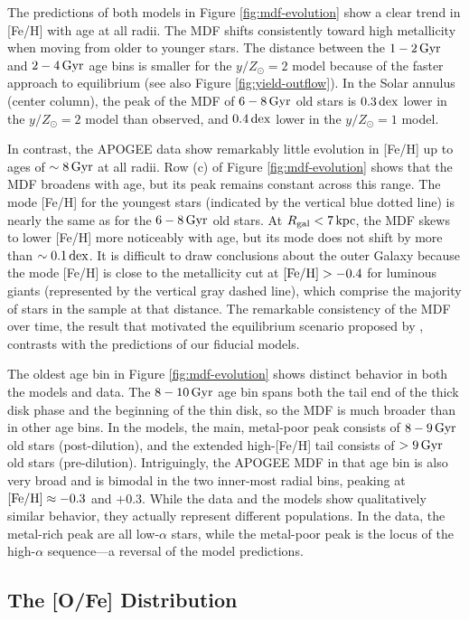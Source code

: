 \documentclass[twocolumn,twocolappendix,linenumbers]{aastex631}
\newcommand{\mathFeH}{{\rm [Fe/H]}}
\newcommand{\yZ}[1]{$y/Z_\odot=#1$}
\newcommand{\kpc}{\,{\rm kpc}}
\newcommand{\Gyr}{\,{\rm Gyr}}
\newcommand{\dex}{\,{\rm dex}}
\begin{document}
The predictions of both models in Figure \ref{fig:mdf-evolution} show a clear trend in [Fe/H] with age at all radii. The MDF shifts consistently toward high metallicity when moving from older to younger stars. The distance between the $1-2\Gyr$ and $2-4\Gyr$ age bins is smaller for the \yZ{2} model because of the faster approach to equilibrium (see also Figure \ref{fig:yield-outflow}). In the Solar annulus (center column), the peak of the MDF of $6-8\Gyr$ old stars is $0.3\dex$ lower in the \yZ{2} model than observed, and $0.4\dex$ lower in the \yZ{1} model.

In contrast, the APOGEE data show remarkably little evolution in [Fe/H] up to ages of $\sim8\Gyr$ at all radii. Row (c) of Figure \ref{fig:mdf-evolution} shows that the MDF broadens with age, but its peak remains constant across this range. The mode [Fe/H] for the youngest stars (indicated by the vertical blue dotted line) is nearly the same as for the $6-8\Gyr$ old stars. At $R_{\rm gal}<7\kpc$, the MDF skews to lower [Fe/H] more noticeably with age, but its mode does not shift by more than $\sim0.1\dex$. It is difficult to draw conclusions about the outer Galaxy because the mode [Fe/H] is close to the metallicity cut at $\mathFeH>-0.4$ for luminous giants (represented by the vertical gray dashed line), which comprise the majority of stars in the sample at that distance. The remarkable consistency of the MDF over time, the result that motivated the equilibrium scenario proposed by \citet{johnson_milky_2024}, contrasts with the predictions of our fiducial models.

The oldest age bin in Figure \ref{fig:mdf-evolution} shows distinct behavior in both the models and data. The $8-10\Gyr$ age bin spans both the tail end of the thick disk phase and the beginning of the thin disk, so the MDF is much broader than in other age bins. In the models, the main, metal-poor peak consists of $8-9\Gyr$ old stars (post-dilution), and the extended high-[Fe/H] tail consists of $>9\Gyr$ old stars (pre-dilution). Intriguingly, the APOGEE MDF in that age bin is also very broad and is bimodal in the two inner-most radial bins, peaking at $\mathFeH\approx-0.3$ and $+0.3$. While the data and the models show qualitatively similar behavior, they actually represent different populations. In the data, the metal-rich peak are all low-$\alpha$ stars, while the metal-poor peak is the locus of the high-$\alpha$ sequence---a reversal of the model predictions.

\subsection{The [O/Fe] Distribution}
\label{sec:abundance-distributions}
\end{document}
